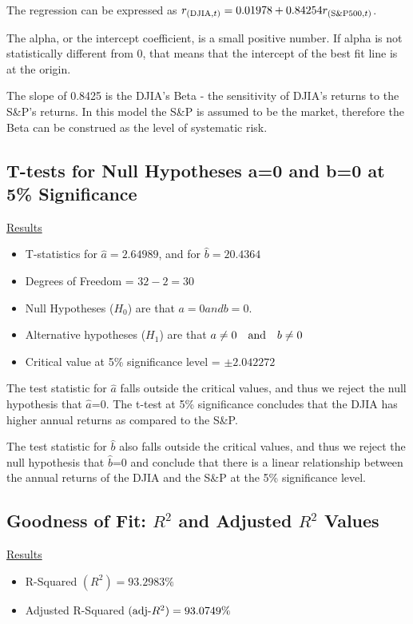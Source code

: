 \documentclass[a4paper]{article}
\begin{document}
    The regression can be expressed as $r_{(\textnormal{DJIA}, t)} = 0.01978 +  0.84254 r_{(\textnormal{S\&P500}, t)}$.
	
	The alpha, or the intercept coefficient, is a small positive number. If alpha is not statistically different from 0, that means that the intercept of the best fit line is at the origin.
	
	The slope of 0.8425 is the DJIA's Beta - the sensitivity of DJIA’s returns to the S\&P’s returns. In this model the S\&P is assumed to be the market, therefore the Beta can be construed as the level of systematic risk.
		
	\subsection{T-tests for Null Hypotheses a=0 and b=0 at 5\% Significance}
	\underline{Results}
	\begin{itemize}[nosep]
		\item T-statistics for $\hat{a} = 2.64989$, and for $\hat{b} = 20.4364$
		\item Degrees of Freedom = $32 - 2 = 30$
		\item Null Hypotheses ($H_0$) are that $a=0 and b=0$.
		\item Alternative hypotheses ($H_1$) are that $a\ne 0 \quad \textnormal{and} \quad b\ne 0$
		\item Critical value at 5\% significance level = $\pm2.042272$
	\end{itemize}

    The test statistic for $\hat{a}$ falls outside the critical values, and thus we reject the null hypothesis that $\hat{a}$=0. The t-test at 5\% significance concludes that the DJIA has higher annual returns as compared to the S\&P.  
    
    The test statistic for $\hat{b}$ also falls outside the critical values, and thus we reject the null hypothesis that $\hat{b}$=0 and conclude that there is a linear relationship between the annual returns of the DJIA and the S\&P at the 5\% significance level.

	\subsection{Goodness of Fit: $R^2$ and Adjusted $R^2$ Values}
	\underline{Results}
	\begin{itemize}[nosep]
		\item R-Squared $(R^2) = 93.2983\%$
		\item Adjusted R-Squared $(\textnormal{adj-}R^2) = 93.0749\%$
	\end{itemize}
\end{document}
